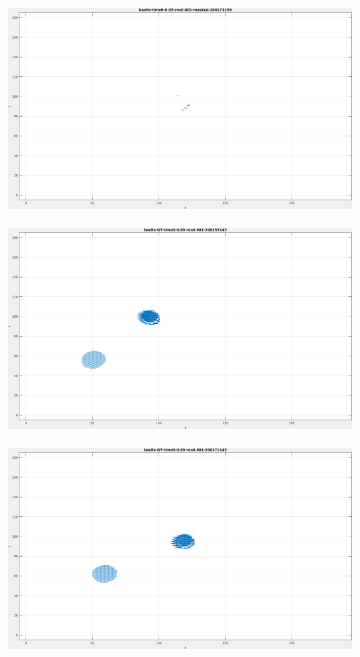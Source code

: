 \begin{appendix}
\begin{figure}[tb]
\begin{subfigure}{.45\textwidth}
  \caption{}
\end{subfigure}
\begin{subfigure}{.45\textwidth}
  \centering
  \includegraphics[height=.6\linewidth]{figs/baelle/baelle-masked-2.png}
  \caption{}
\end{subfigure}
\begin{subfigure}{.45\textwidth}
  \centering
  \includegraphics[height=.6\linewidth]{figs/baelle/baelle-GT-1.png}
  \caption{}
\end{subfigure}
\begin{subfigure}{.45\textwidth}
  \centering
  \includegraphics[height=.6\linewidth]{figs/baelle/baelle-GT-2.png}

\end{subfigure}
\end{figure}
\end{appendix}
